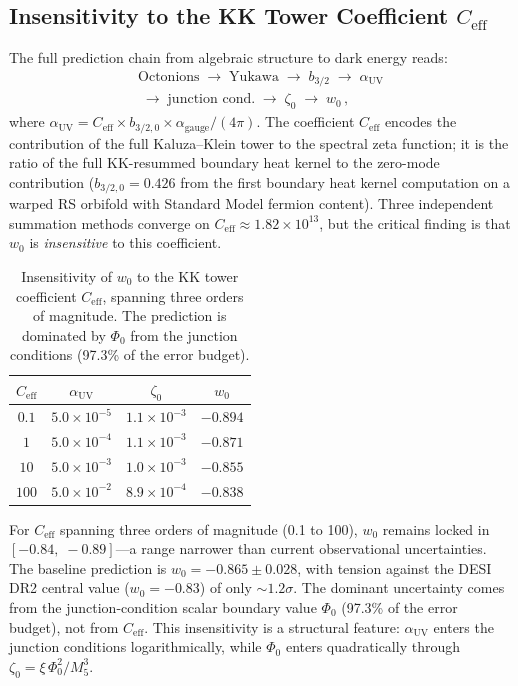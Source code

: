 \subsection{Insensitivity to the KK Tower Coefficient $C_\mathrm{eff}$}
\label{sec:2-Ceff}

The full prediction chain from algebraic structure to dark energy reads:
\begin{multline}
\text{Octonions} \;\to\; \text{Yukawa} \;\to\; b_{3/2} \;\to\; \alpha_\mathrm{UV} \\
\;\to\; \text{junction cond.} \;\to\; \zeta_0 \;\to\; w_0\,,
\label{eq:2-chain-full}
\end{multline}
where $\alpha_\mathrm{UV} = C_\mathrm{eff} \times b_{3/2,0} \times \alpha_\mathrm{gauge}/(4\pi)$. The coefficient $C_\mathrm{eff}$ encodes the contribution of the full Kaluza--Klein tower to the spectral zeta function; it is the ratio of the full KK-resummed boundary heat kernel to the zero-mode contribution ($b_{3/2,0} = 0.426$ from the first boundary heat kernel computation on a warped RS orbifold with Standard Model fermion content). Three independent summation methods converge on $C_\mathrm{eff} \approx 1.82 \times 10^{13}$, but the critical finding is that $w_0$ is \emph{insensitive} to this coefficient.

\begin{table}[htbp]
\centering
\caption{Insensitivity of $w_0$ to the KK tower coefficient $C_\mathrm{eff}$, spanning three orders of magnitude. The prediction is dominated by $\Phi_0$ from the junction conditions (97.3\% of the error budget).}
\label{tab:2-Ceff}
\begin{tabular}{cccc}
\toprule
$C_\mathrm{eff}$ & $\alpha_\mathrm{UV}$ & $\zeta_0$ & $w_0$ \\
\midrule
$0.1$   & $5.0 \times 10^{-5}$ & $1.1 \times 10^{-3}$ & $-0.894$ \\
$1$     & $5.0 \times 10^{-4}$ & $1.1 \times 10^{-3}$ & $-0.871$ \\
$10$    & $5.0 \times 10^{-3}$ & $1.0 \times 10^{-3}$ & $-0.855$ \\
$100$   & $5.0 \times 10^{-2}$ & $8.9 \times 10^{-4}$ & $-0.838$ \\
\bottomrule
\end{tabular}
\end{table}

For $C_\mathrm{eff}$ spanning three orders of magnitude (0.1 to 100), $w_0$ remains locked in $[-0.84,\; -0.89]$---a range narrower than current observational uncertainties. The baseline prediction is $w_0 = -0.865 \pm 0.028$, with tension against the DESI DR2 central value ($w_0 = -0.83$) of only ${\sim}1.2\sigma$. The dominant uncertainty comes from the junction-condition scalar boundary value $\Phi_0$ (97.3\% of the error budget), not from $C_\mathrm{eff}$. This insensitivity is a structural feature: $\alpha_\mathrm{UV}$ enters the junction conditions logarithmically, while $\Phi_0$ enters quadratically through $\zeta_0 = \xi\,\Phi_0^2/M_5^3$.

